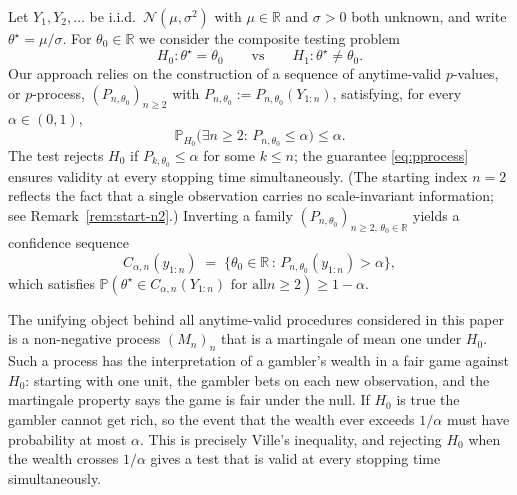 \documentclass[numsec,webpdf,modern,medium,namedate]{oup-authoring-template}
\theoremstyle{thmstyleone}%
\theoremstyle{thmstyletwo}%
\theoremstyle{thmstylethree}%
\newcommand{\Prob}{\mathbb{P}}
\newcommand{\1}{\mathbf{1}}
\begin{document}
Let \(Y_1,Y_2,\ldots\) be i.i.d.\ \(\mathcal N(\mu,\sigma^2)\) with
\(\mu\in\mathbb{R}\) and \(\sigma>0\) both unknown, and write
\(\theta^\star=\mu/\sigma\). For \(\theta_0\in\mathbb{R}\) we consider the
composite testing problem
\begin{equation}\label{eq:tests}
 H_0\!:\theta^\star=\theta_0 \qquad\text{vs}\qquad   H_1\!:\theta^\star\neq\theta_0.
\end{equation}
Our approach relies on the construction of a sequence of anytime-valid $p$-values, or $p$-process, $(P_{n,\theta_0})_{n\geq 2}$ with $P_{n,\theta_0}:=P_{n,\theta_0}(Y_{1:n})$, satisfying, for every $\alpha\in (0,1)$,
\begin{equation}\label{eq:pprocess}
   \Prob_{H_0}\!\bigl(\exists n\geq 2:\, P_{n,\theta_0}\leq \alpha\bigr)
   \leq \alpha.
\end{equation}
The test rejects $H_0$ if $P_{k,\theta_0}\leq \alpha$ for some $k\leq n$; the guarantee \eqref{eq:pprocess} ensures validity at every stopping time simultaneously. (The starting index $n=2$ reflects the fact that a single observation carries no scale-invariant information; see Remark~\ref{rem:start-n2}.) Inverting a family \((P_{n,\theta_0})_{n\geq 2,\,\theta_0\in\mathbb{R}}\) yields a confidence sequence
\begin{equation}\label{eq:CS-from-pproc}
   C_{\alpha,n}(y_{1:n})
   \;=\;\bigl\{\theta_0\in\mathbb{R}\,:\,P_{n,\theta_0}(y_{1:n})>\alpha\bigr\},
\end{equation}
which satisfies
\(\Prob(\theta^\star\in C_{\alpha,n}(Y_{1:n})\text{ for all
}n\geq 2)\geq 1-\alpha\).



The unifying object behind all anytime-valid procedures considered in this paper is a non-negative process \((M_n)_{n}\) that is a martingale of mean one under \(H_0\). Such a process has the interpretation of a gambler's wealth in a fair game against \(H_0\): starting with one unit, the gambler bets on each new observation, and the martingale property says the game is fair under the null. If \(H_0\) is true the gambler cannot get rich, so the event that the wealth ever exceeds \(1/\alpha\) must have probability at most \(\alpha\). This is precisely Ville's inequality, and rejecting \(H_0\) when the wealth crosses \(1/\alpha\) gives a test that is valid at every stopping time simultaneously.
\end{document}
